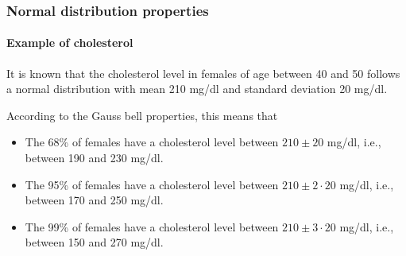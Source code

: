 \begin{frame}
\frametitle{Normal distribution properties}
\framesubtitle{Example of cholesterol}
It is known that the cholesterol level in females of age between 40 and 50 follows a normal distribution with mean 210 mg/dl and standard deviation 20 mg/dl. 

According to the Gauss bell properties, this means that
\begin{itemize}
\item The 68\% of females have a cholesterol level between $210\pm 20$ mg/dl, i.e., between 190 and 230 mg/dl.
\item The 95\% of females have a cholesterol level between $210\pm 2\cdot 20$ mg/dl, i.e., between  170 and 250
mg/dl.
\item The 99\% of females have a cholesterol level between $210\pm 3\cdot 20$ mg/dl, i.e., between  150 and 270
mg/dl.
\end{itemize}
\end{frame}


